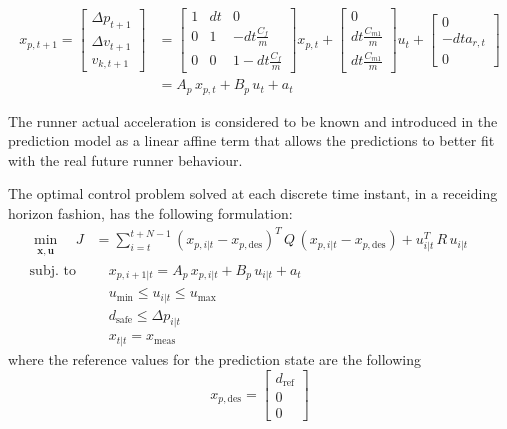 \documentclass[a4paper,12pt,oneside]{book}
\begin{document}
\begin{equation}
\begin{aligned}
    x_{p,t+1} = 
        \begin{bmatrix}
            \Delta p_{t+1}  \\
            \Delta v_{t+1} \\
            v_{k,t+1}
        \end{bmatrix}
        & =
        \begin{bmatrix}
            1 & dt & 0 \\
            0 & 1 & -dt\frac{C_f}{m} \\
            0 & 0 & 1-dt\frac{C_f}{m}
        \end{bmatrix}
        x_{p,t}
        +
        \begin{bmatrix}
            0 \\
            dt \frac{C_{m1}}{m} \\
            dt \frac{C_{m1}}{m}
        \end{bmatrix}
        u_t + 
        \begin{bmatrix}
        0 \\
        - dt a_{r,t} \\
        0
        \end{bmatrix} \\
        & = A_p \, x_{p,t} + B_p \, u_t + a_t
\end{aligned}
\label{Prediction_model_MPC}
\end{equation}

The runner actual acceleration is considered to be known and introduced in the prediction model as a linear affine term that allows the predictions to better fit with the real future runner behaviour.

\bigskip
The optimal control problem solved at each discrete time instant, in a receiding horizon fashion, has the following formulation:
\begin{equation}
\begin{alignedat}{2}
	\min_{\substack{\boldsymbol{x}, \boldsymbol{u}}}\quad J &= \sum_{i=t}^{t+N-1} (x_{p,i|t} - x_{p,\text{des}}) ^T \, Q \, (x_{p,i|t} - x_{p,\text{des}}) +  u_{i|t}^T \, R \, u_{i|t} &&   \\
	\text{subj. to} & \quad x_{p,i+1|t}  = A_p \, x_{p,i|t} + B_p \, u_{i|t} + a_t && \\
    &\quad u_{\text{min}} \leq u_{i|t} \leq u_{\text{max}}&& \\
    &\quad d_{\text{safe}}\leq \Delta p_{i|t} &&  \\
    &\quad x_{t|t} = x_{\text{meas}} &&
\end{alignedat}
\label{MPC_formulation}
\end{equation}
where the reference values for the prediction state are the following
\begin{equation}
    x_{p,\text{des}} =
    \begin{bmatrix}
        d_{\text{ref}}  \\
        0 \\
        0
    \end{bmatrix}
\end{equation}
\end{document}

